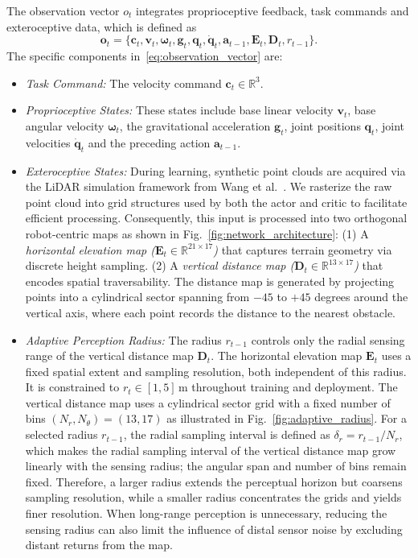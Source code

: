 The observation vector $o_t$ integrates proprioceptive feedback, task commands and exteroceptive data, which is defined as
\begin{equation}
\mathbf{o}_t = \{
\mathbf{c}_t, 
\mathbf{v}_t, \boldsymbol{\omega}_t, \mathbf{g}_t, \mathbf{q}_t, \dot{\mathbf{q}}_t, \mathbf{a}_{t-1},
\mathbf{E}_t, \mathbf{D}_t, r_{t-1}
\}.
\label{eq:observation_vector}
\end{equation}
The specific components in~\eqref{eq:observation_vector} are:
\begin{itemize}
    \item \textit{Task Command:} The velocity command $\mathbf{c}_t \in \mathbb{R}^3$.
    \item \textit{Proprioceptive States:} These states include base linear velocity $\mathbf{v}_t$, base angular velocity $\boldsymbol{\omega}_t$, the gravitational acceleration $\mathbf{g}_t$, joint positions $\mathbf{q}_t$, joint velocities $\dot{\mathbf{q}}_t$ and the preceding action $\mathbf{a}_{t-1}$.
    \item \textit{Exteroceptive States:} During learning, synthetic point clouds are acquired via the LiDAR simulation framework from Wang et al.~\cite{Wang_2025_Omni-Perception}.
    We rasterize the raw point cloud into grid structures used by both the actor and critic to facilitate efficient processing. Consequently, this input is processed into two orthogonal robot-centric maps as shown in Fig.~\ref{fig:network_architecture}:
    (1) A \textit{horizontal elevation map ($\mathbf{E}_t \in \mathbb{R}^{21 \times 17}$)} that captures terrain geometry via discrete height sampling.
    (2) A \textit{vertical distance map ($\mathbf{D}_t \in \mathbb{R}^{13 \times 17}$)} that encodes spatial traversability. The distance map is generated by projecting points into a cylindrical sector spanning from $-45$ to $+45$ degrees around the vertical axis, where each point records the distance to the nearest obstacle.
    \item \textit{Adaptive Perception Radius:} The radius $r_{t-1}$ controls only the radial sensing range of the vertical distance map $\mathbf{D}_t$. The horizontal elevation map $\mathbf{E}_t$ uses a fixed spatial extent and sampling resolution, both independent of this radius. It is constrained to $r_t \in [1, 5]$\,m throughout training and deployment. The vertical distance map uses a cylindrical sector grid with a fixed number of bins $(N_r, N_\theta) = (13, 17)$ as illustrated in Fig.~\ref{fig:adaptive_radius}. For a selected radius $r_{t-1}$, the radial sampling interval is defined as
    $\delta_r = {r_{t-1}}/{N_r}$,
    which makes the radial sampling interval of the vertical distance map grow linearly with the sensing radius; the angular span and number of bins remain fixed. Therefore, a larger radius extends the perceptual horizon but coarsens sampling resolution, while a smaller radius concentrates the grids and yields finer resolution. When long-range perception is unnecessary, reducing the sensing radius can also limit the influence of distal sensor noise by excluding distant returns from the map.
\end{itemize}
    
